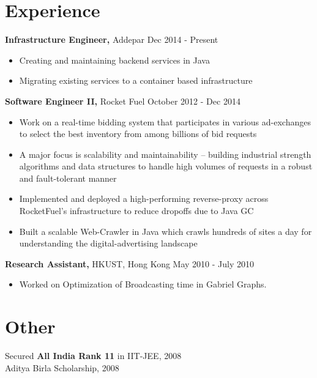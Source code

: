 \documentclass[margin]{res}
\begin{document}
\begin{resume}
\section{Experience}
 {\bf Infrastructure Engineer,} Addepar \hfill Dec  2014  - Present
 \begin{itemize} \itemsep -2pt  %
 \item Creating and maintaining backend services in Java
 \item Migrating existing services to a container based infrastructure
 \end{itemize}

 {\bf Software Engineer II,} Rocket Fuel \hfill October 2012 - Dec 2014
 \begin{itemize} \itemsep -2pt  %
 \item Work on a real-time bidding system that participates in various ad-exchanges to select the best inventory from among billions of bid requests
 \item A major focus is scalability and maintainability -- building industrial strength algorithms and data structures to handle high volumes of requests in a robust and fault-tolerant manner
 \item Implemented and deployed a high-performing reverse-proxy across RocketFuel's infrastructure to reduce dropoffs due to Java GC
 \item Built a scalable Web-Crawler in Java which crawls hundreds of sites a day for understanding the digital-advertising landscape
 \end{itemize}

 {\bf Research Assistant,} HKUST, Hong Kong \hfill May  2010  - July  2010
 \begin{itemize} \itemsep -2pt  %
 \item Worked  on  Optimization  of  Broadcasting  time  in  Gabriel  Graphs.
 \end{itemize}





\section{Other}
 Secured {\bf All India Rank 11} in IIT-JEE, 2008 \\
Aditya Birla Scholarship, 2008 \\




\end{resume}
\end{document}
